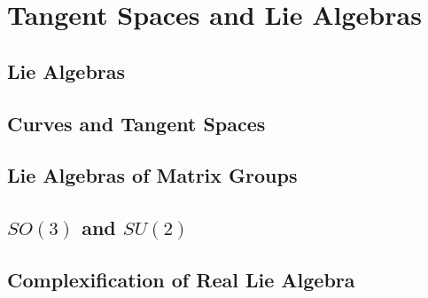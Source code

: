 \chapter{Tangent Spaces and Lie Algebras}

\section{Lie Algebras}

\section{Curves and Tangent Spaces}

\section{Lie Algebras of Matrix Groups}

\section{$SO(3)$ and $SU(2)$}

\section{Complexification of Real Lie Algebra}


